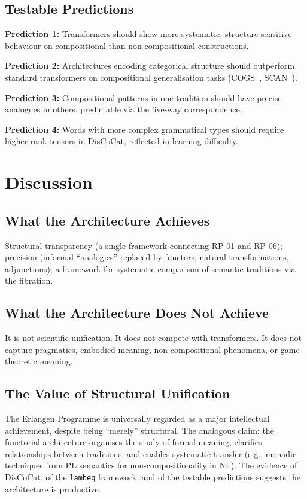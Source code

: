 \documentclass[12pt,a4paper]{article}
\begin{document}
\subsection{Testable Predictions}

\textbf{Prediction 1:} Transformers should show more systematic,
structure-sensitive behaviour on compositional than non-compositional
constructions.

\textbf{Prediction 2:} Architectures encoding categorical structure should
outperform standard transformers on compositional generalisation tasks
(COGS~\cite{KimLinzen2020}, SCAN~\cite{LakeBaroni2018}).

\textbf{Prediction 3:} Compositional patterns in one tradition should have
precise analogues in others, predictable via the five-way correspondence.

\textbf{Prediction 4:} Words with more complex grammatical types should
require higher-rank tensors in DisCoCat, reflected in learning difficulty.

\section{Discussion}

\subsection{What the Architecture Achieves}

Structural transparency (a single framework connecting RP-01 and RP-06);
precision (informal ``analogies'' replaced by functors, natural
transformations, adjunctions); a framework for systematic comparison of
semantic traditions via the fibration.

\subsection{What the Architecture Does Not Achieve}

It is not scientific unification. It does not compete with transformers. It
does not capture pragmatics, embodied meaning, non-compositional phenomena,
or game-theoretic meaning.

\subsection{The Value of Structural Unification}

The Erlangen Programme is universally regarded as a major intellectual
achievement, despite being ``merely'' structural. The analogous claim: the
functorial architecture organises the study of formal meaning, clarifies
relationships between traditions, and enables systematic transfer
(e.g., monadic techniques from PL semantics for non-compositionality in NL).
The evidence of DisCoCat, of the \texttt{lambeq} framework, and of the
testable predictions suggests the architecture is productive.
\end{document}
